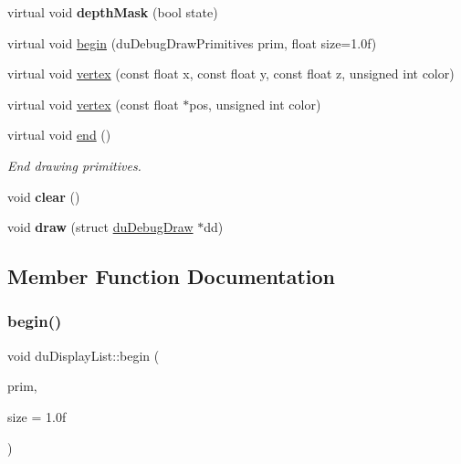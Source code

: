\begin{DoxyCompactItemize}
virtual void {\bfseries depth\+Mask} (bool state)
\item 
virtual void \hyperlink{classduDisplayList_af71c472060ddabb596471dce5eb3e95f}{begin} (du\+Debug\+Draw\+Primitives prim, float size=1.\+0f)
\item 
virtual void \hyperlink{classduDisplayList_aa98c1a7225f0af78674db24c75afe6f3}{vertex} (const float x, const float y, const float z, unsigned int color)
\item 
virtual void \hyperlink{classduDisplayList_a5560d17b5190f75733154af2610ed83f}{vertex} (const float $\ast$pos, unsigned int color)
\item 
\mbox{\label{classduDisplayList_a9db7bedb413358d47a3b6ca9d958f5a0}} 
virtual void \hyperlink{classduDisplayList_a9db7bedb413358d47a3b6ca9d958f5a0}{end} ()
\begin{DoxyCompactList}\small\item\em End drawing primitives. \end{DoxyCompactList}\item 
\mbox{\label{classduDisplayList_a5a6da38566e95882f4b63c0d765b2cc3}} 
void {\bfseries clear} ()
\item 
\mbox{\label{classduDisplayList_a53556c9d2afcd9eb625bc4f4cf9cf648}} 
void {\bfseries draw} (struct \hyperlink{structduDebugDraw}{du\+Debug\+Draw} $\ast$dd)
\end{DoxyCompactItemize}


\subsection{Member Function Documentation}
\mbox{\label{classduDisplayList_a9b22850cbe77c3e59f00ceda818563ea}} 
\subsubsection{\texorpdfstring{begin()}{begin()}\hspace{0.1cm}{\footnotesize\ttfamily [1/2]}}
{\footnotesize\ttfamily void du\+Display\+List\+::begin (\begin{DoxyParamCaption}\item[{du\+Debug\+Draw\+Primitives}]{prim,  }\item[{float}]{size = {\ttfamily 1.0f} }\end{DoxyParamCaption})\hspace{0.3cm}{\ttfamily [virtual]}}


